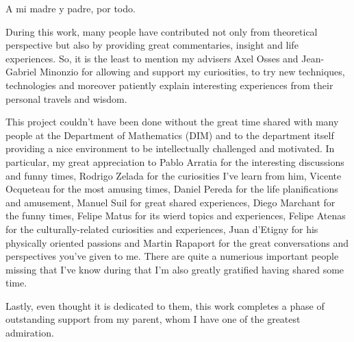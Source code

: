 \documentclass[upright, contnum]{umemoria}
\begin{document}
\begin{dedicated}
A mi madre y padre, por todo.
\end{dedicated}

\begin{thanks}
During this work, many people have contributed not only from theoretical perspective but also by providing great commentaries, insight and life experiences. So, it is the least to mention my advisers Axel Osses and Jean-Gabriel Minonzio for allowing and support my curiosities, to try new techniques, technologies and moreover patiently explain interesting experiences from their personal travels and wisdom. 

This project couldn't have been done without the great time shared with many people at the Department of Mathematics (DIM) and to the department itself providing a nice environment to be intellectually challenged and motivated.
In particular, my great appreciation to Pablo Arratia for the interesting discussions and funny times, Rodrigo Zelada for the curiosities I've learn from him, Vicente Ocqueteau for the most amusing times, Daniel Pereda for the life planifications and amusement, Manuel Suil for great shared experiences, Diego Marchant for the funny times, Felipe Matus for its wierd topics and experiences, Felipe Atenas for the culturally-related curiosities and experiences, Juan d'Etigny for his physically oriented passions and Martin Rapaport for the great conversations and perspectives you've given to me. 
There are quite a numerious important people missing that I've know during that I'm also greatly gratified having shared some time.

Lastly, even thought it is dedicated to them, this work completes a phase of outstanding support from my parent, whom I have one of the greatest admiration.

\end{thanks}


\cleardoublepage

\tableofcontents
\listoftables %
\listoffigures %

\mainmatter










 


\end{document}
